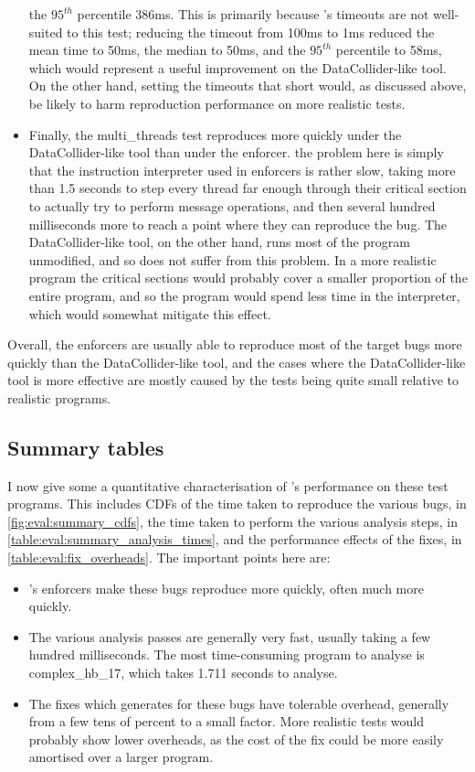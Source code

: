 \begin{itemize}
  the $95^{th}$ percentile 386ms.  This is primarily because
  {\technique}'s timeouts are not well-suited to this test; reducing
  the timeout from 100ms to 1ms reduced the mean time to 50ms, the
  median to 50ms, and the $95^{th}$ percentile to 58ms, which would
  represent a useful improvement on the DataCollider-like tool.  On
  the other hand, setting the timeouts that short would, as discussed
  above, be likely to harm reproduction performance on more realistic
  tests.
\item Finally, the multi\_threads test reproduces more quickly under
  the DataCollider-like tool than under the {\technique} enforcer.
  the problem here is simply that the instruction interpreter used in
  {\technique} enforcers is rather slow, taking more than 1.5 seconds
  to step every thread far enough through their critical section to
  actually try to perform message operations, and then several hundred
  milliseconds more to reach a point where they can reproduce the bug.
  The DataCollider-like tool, on the other hand, runs most of the
  program unmodified, and so does not suffer from this problem.  In a
  more realistic program the critical sections would probably cover a
  smaller proportion of the entire program, and so the program would
  spend less time in the interpreter, which would somewhat mitigate
  this effect.
\end{itemize}

Overall, the {\technique} enforcers are usually able to reproduce most
of the target bugs more quickly than the DataCollider-like tool, and
the cases where the DataCollider-like tool is more effective are
mostly caused by the tests being quite small relative to realistic
programs.

\subsection{Summary tables}

I now give some a quantitative characterisation of {\technique}'s
performance on these test programs.  This includes CDFs of the time
taken to reproduce the various bugs, in
\autoref{fig:eval:summary_cdfs}, the time taken to perform the various
analysis steps, in \autoref{table:eval:summary_analysis_times}, and
the performance effects of the fixes, in
\autoref{table:eval:fix_overheads}.  The important points here are:

\begin{itemize}
\item {\Technique}'s enforcers make these bugs reproduce more quickly,
  often much more quickly.
\item The various analysis passes are generally very fast, usually
  taking a few hundred milliseconds.  The most time-consuming program
  to analyse is complex\_hb\_17, which takes 1.711 seconds to analyse.
\item The fixes which {\technique} generates for these bugs have
  tolerable overhead, generally from a few tens of percent to a small
  factor.  More realistic tests would probably show lower overheads,
  as the cost of the fix could be more easily amortised over a larger
  program.
\end{itemize}

